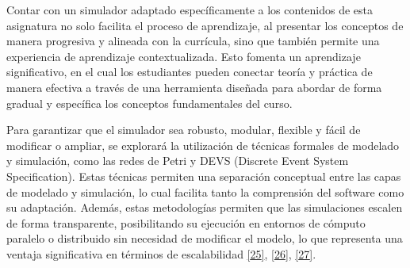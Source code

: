 \documentclass[12pt,oneside]{templates/unerthesis}
\begin{document}
\begin{table}[!h]
\centering
\caption{\label{tab:funcionalidadessimulador}Funcionalidades principales del simulador propuesto}
\centering
{}
\end{table}

Contar con un simulador adaptado específicamente a los contenidos de esta asignatura no solo facilita el proceso de aprendizaje, al presentar los conceptos de manera progresiva y alineada con la currícula, sino que también permite una experiencia de aprendizaje contextualizada. Esto fomenta un aprendizaje significativo, en el cual los estudiantes pueden conectar teoría y práctica de manera efectiva a través de una herramienta diseñada para abordar de forma gradual y específica los conceptos fundamentales del curso.

Para garantizar que el simulador sea robusto, modular, flexible y fácil de modificar o ampliar, se explorará la utilización de técnicas formales de modelado y simulación, como las redes de Petri y DEVS (Discrete Event System Specification). Estas técnicas permiten una separación conceptual entre las capas de modelado y simulación, lo cual facilita tanto la comprensión del software como su adaptación. Además, estas metodologías permiten que las simulaciones escalen de forma transparente, posibilitando su ejecución en entornos de cómputo paralelo o distribuido sin necesidad de modificar el modelo, lo que representa una ventaja significativa en términos de escalabilidad \protect\hyperlink{ref-peterson_petri_1981}{{[}25{]}}, \protect\hyperlink{ref-zeigler_theory_2000}{{[}26{]}}, \protect\hyperlink{ref-zeigler_theory_2018}{{[}27{]}}.
\end{document}
